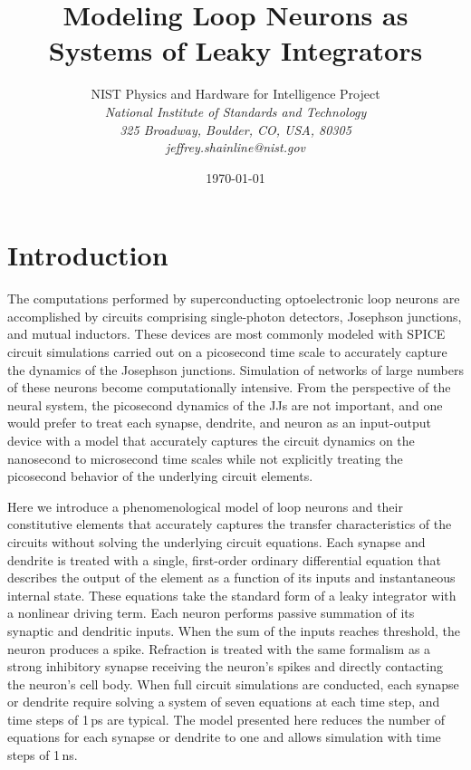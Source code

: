 \documentclass[twocolumn]{article}
\title{Modeling Loop Neurons as Systems of Leaky Integrators}
\author[1]{\Large{NIST Physics and Hardware for Intelligence Project}
\\
\textit{\large{National Institute of Standards and Technology}}
\\
\vspace{-0.2em}
\textit{\large{325 Broadway, Boulder, CO, USA, 80305}}
\\
\vspace{-0.2em}
\textit{\large{jeffrey.shainline@nist.gov}}
}
\date{\today}%
\begin{document}

\setcounter{tocdepth}{1}
\setcounter{secnumdepth}{4}
\tableofcontents

\section{\label{sec:introduction}Introduction}
The computations performed by superconducting optoelectronic loop neurons are accomplished by circuits comprising single-photon detectors, Josephson junctions, and mutual inductors. These devices are most commonly modeled with SPICE circuit simulations carried out on a picosecond time scale to accurately capture the dynamics of the Josephson junctions. Simulation of networks of large numbers of these neurons become computationally intensive. From the perspective of the neural system, the picosecond dynamics of the JJs are not important, and one would prefer to treat each synapse, dendrite, and neuron as an input-output device with a model that accurately captures the circuit dynamics on the nanosecond to microsecond time scales while not explicitly treating the picosecond behavior of the underlying circuit elements.

Here we introduce a phenomenological model of loop neurons and their constitutive elements that accurately captures the transfer characteristics of the circuits without solving the underlying circuit equations. Each synapse and dendrite is treated with a single, first-order ordinary differential equation that describes the output of the element as a function of its inputs and instantaneous internal state. These equations take the standard form of a leaky integrator with a nonlinear driving term. Each neuron performs passive summation of its synaptic and dendritic inputs. When the sum of the inputs reaches threshold, the neuron produces a spike. Refraction is treated with the same formalism as a strong inhibitory synapse receiving the neuron's spikes and directly contacting the neuron's cell body. When full circuit simulations are conducted, each synapse or dendrite require solving a system of seven equations at each time step, and time steps of 1\,ps are typical. The model presented here reduces the number of equations for each synapse or dendrite to one and allows simulation with time steps of 1\,ns. 
\end{document}
